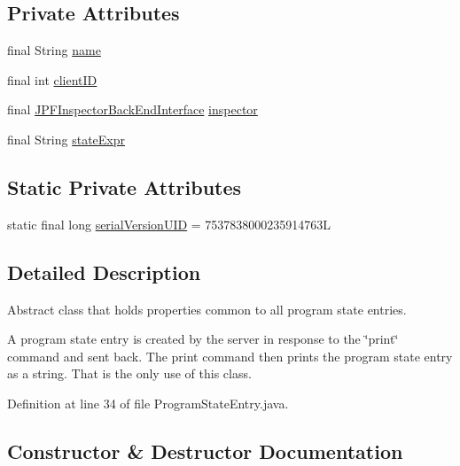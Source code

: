 \subsection*{Private Attributes}
\begin{DoxyCompactItemize}
\item 
final String \hyperlink{classgov_1_1nasa_1_1jpf_1_1inspector_1_1common_1_1pse_1_1_program_state_entry_a5fbdd37745a66317f1ea7738c3bda2a6}{name}
\item 
final int \hyperlink{classgov_1_1nasa_1_1jpf_1_1inspector_1_1common_1_1pse_1_1_program_state_entry_a5743d1d799e3e1e864755f1040da1962}{client\+ID}
\item 
final \hyperlink{interfacegov_1_1nasa_1_1jpf_1_1inspector_1_1interfaces_1_1_j_p_f_inspector_back_end_interface}{J\+P\+F\+Inspector\+Back\+End\+Interface} \hyperlink{classgov_1_1nasa_1_1jpf_1_1inspector_1_1common_1_1pse_1_1_program_state_entry_a90505dcc99081cf8eee88c360c771bf6}{inspector}
\item 
final String \hyperlink{classgov_1_1nasa_1_1jpf_1_1inspector_1_1common_1_1pse_1_1_program_state_entry_a5051697f441f235c01ebcaaf0616555d}{state\+Expr}
\end{DoxyCompactItemize}
\subsection*{Static Private Attributes}
\begin{DoxyCompactItemize}
\item 
static final long \hyperlink{classgov_1_1nasa_1_1jpf_1_1inspector_1_1common_1_1pse_1_1_program_state_entry_a8209a0631fc0a9be915a372a69ef1dc2}{serial\+Version\+U\+ID} = 7537838000235914763L
\end{DoxyCompactItemize}


\subsection{Detailed Description}
Abstract class that holds properties common to all program state entries. 

A program state entry is created by the server in response to the \char`\"{}print\char`\"{} command and sent back. The print command then prints the program state entry as a string. That is the only use of this class. 

Definition at line 34 of file Program\+State\+Entry.\+java.



\subsection{Constructor \& Destructor Documentation}
